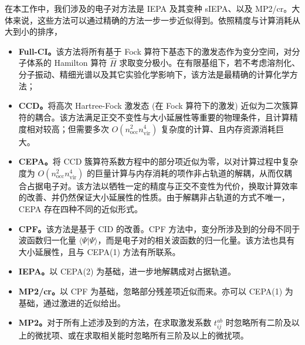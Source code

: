 在本工作中，我们涉及的电子对方法是 IEPA 及其变种 sIEPA、以及 MP2/cr。大体来说，这些方法可以通过精确的方法一步一步近似得到。依照精度与计算消耗从大到小的排序，
\begin{itemize}[nosep]
  \item \textbf{Full-CI。}该方法将所有基于 Fock 算符下基态下的激发态作为变分空间，对分子体系的 Hamilton 算符 $\hat H$ 求取变分极小。在有限基组下，若不考虑溶剂化、分子振动、精细光谱以及其它实验化学影响下，该方法是最精确的计算化学方法；
  \item \textbf{CCD}\cite{Coester-Coester.NPB.1958, Coester-Kuemmel.NPB.1960, Cizek-Cizek.JCP.1966, Cizek-Paldus.IJQC.1971}\textbf{。}将高次 Hartree-Fock 激发态 (在 Fock 算符下的激发) 近似为二次簇算符的耦合。该方法满足正交不变性与大小延展性等重要的物理条件，且计算精度相对较高；但需要多次 $O(n_\mathrm{occ}^2 n_\mathrm{vir}^4)$ 复杂度的计算、且内存资源消耗巨大。
  \item \textbf{CEPA}\cite{Ahlrichs-Ahlrichs.CPC.1979}\textbf{。}将 CCD 簇算符系数方程中的部分项近似为零，以对计算过程中复杂度为 $O(n_\mathrm{occ}^2 n_\mathrm{vir}^4)$ 的巨量计算与内存消耗的项作非占轨道的解耦，从而仅耦合占据电子对。该方法以牺牲一定的精度与正交不变性为代价，换取计算效率的改善、并仍然保证大小延展性的性质。由于解耦非占轨道的方式不唯一，CEPA 存在四种不同的近似形式。
  \item \textbf{CPF}\cite{Ahlrichs-Ehrhardt.JCP.1985}\textbf{。}该方法是基于 CID 的改善。CPF 方法中，变分所涉及到的分母不同于波函数归一化量 $\langle \Psi | \Psi \rangle$，而是电子对的相关波函数的归一化量。该方法也具有大小延展性，且与 CEPA(1) 方法有所联系。
  \item \textbf{IEPA}\cite{Sinanoǧlu-Sinanoǧlu.ACP.1964, Nesbet-Nesbet.ACP.1965}\textbf{。}以 CEPA(2) 为基础，进一步地解耦成对占据轨道。
  \item \textbf{MP2/cr}\cite{Dykstra-Davidson.IJQC.2000}\textbf{。}以 CPF 为基础，忽略部分残差项近似而来。亦可以 CEPA(1) 为基础，通过激进的近似给出。
  \item \textbf{MP2}\cite{Moeller-Plesset.PR.1934}\textbf{。}对于所有上述涉及到的方法，在求取激发系数 $t_{ij}^{ab}$ 时忽略所有二阶及以上的微扰项、或在求取相关能时忽略所有三阶及以上的微扰项。
\end{itemize}

